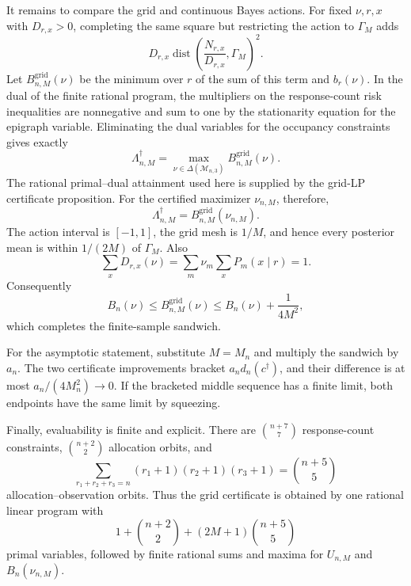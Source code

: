 It remains to compare the grid and continuous Bayes actions.  For fixed \(\nu,r,x\) with \(D_{r,x}>0\), completing the same square but restricting the action to \(\Gamma_M\) adds
\[
 D_{r,x}\operatorname{dist}\!\left(
 \frac{N_{r,x}}{D_{r,x}},\Gamma_M\right)^2.
\]
Let \(B_{n,M}^{\mathrm{grid}}(\nu)\) be the minimum over \(r\) of the sum of this term and \(b_r(\nu)\).  In the dual of the finite rational program, the multipliers on the response-count risk inequalities are nonnegative and sum to one by the stationarity equation for the epigraph variable.  Eliminating the dual variables for the occupancy constraints gives exactly
\[
 \Lambda_{n,M}^\dagger
 =\max_{\nu\in\Delta(\mathcal M_{n,3})}
 B_{n,M}^{\mathrm{grid}}(\nu).
\]
The rational primal--dual attainment used here is supplied by the grid-LP certificate proposition.  For the certified maximizer \(\nu_{n,M}\), therefore,
\[
 \Lambda_{n,M}^\dagger=B_{n,M}^{\mathrm{grid}}(\nu_{n,M}).
\]
The action interval is \([-1,1]\), the grid mesh is \(1/M\), and hence every posterior mean is within \(1/(2M)\) of \(\Gamma_M\).  Also
\[
 \sum_xD_{r,x}(\nu)=\sum_m\nu_m\sum_xP_m(x\mid r)=1.
\]
Consequently
\[
 B_n(\nu)\leq B_{n,M}^{\mathrm{grid}}(\nu)
 \leq B_n(\nu)+\frac{1}{4M^2},
\]
which completes the finite-sample sandwich.

For the asymptotic statement, substitute \(M=M_n\) and multiply the sandwich by \(a_n\).  The two certificate improvements bracket \(a_nd_n(c^\dagger)\), and their difference is at most \(a_n/(4M_n^2)\to0\).  If the bracketed middle sequence has a finite limit, both endpoints have the same limit by squeezing.

Finally, evaluability is finite and explicit.  There are \(\binom{n+7}{7}\) response-count constraints, \(\binom{n+2}{2}\) allocation orbits, and
\[
 \sum_{r_1+r_2+r_3=n}(r_1+1)(r_2+1)(r_3+1)=\binom{n+5}{5}
\]
allocation--observation orbits.  Thus the grid certificate is obtained by one rational linear program with
\[
 1+\binom{n+2}{2}+(2M+1)\binom{n+5}{5}
\]
primal variables, followed by finite rational sums and maxima for \(U_{n,M}\) and \(B_n(\nu_{n,M})\).